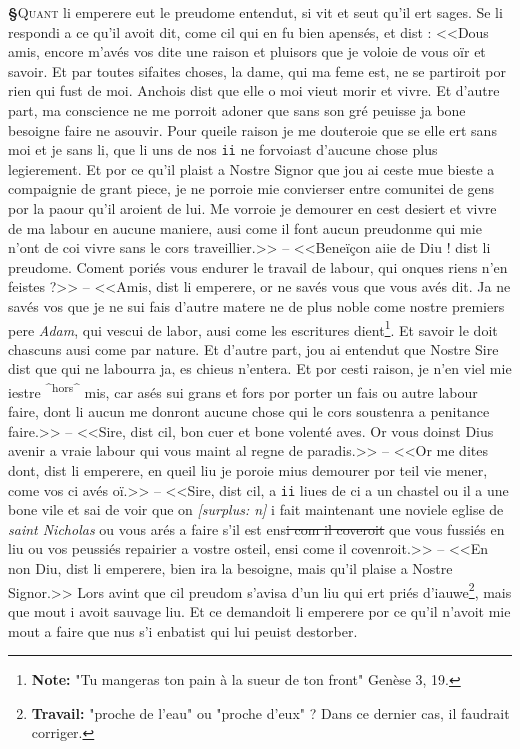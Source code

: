 \documentclass[12pt]{article} %
\newcommand{\persName}[1]{\emph{#1}} %
\newcommand{\num}[1]{\texttt{#1}}    %
\newcommand{\add}[1]{\textsuperscript{#1}}       %
\newcommand{\fnnote}[1]{\footnote{\textbf{Note:} #1}} %
\newcommand{\fnworknote}[1]{\footnote{\textbf{Travail:} #1}} %
\newcommand{\del}[1]{\sout{#1}}      %
\newcommand{\surplus}[1]{\textit{[surplus: #1]}} %
\newcounter{paranum}
\newcommand{\pnum}{\stepcounter{paranum}\textbf{§\arabic{paranum}}\quad}
\begin{document}
\pnum \lettrine[lines=2]{\color{darkblue}Q}{uant} li emperere eut le preudome entendut, si vit et seut qu'il ert sages. Se li respondi a ce qu'il avoit dit, come cil qui en fu bien apensés, et dist : <<Dous amis, encore m'avés vos dite une raison et pluisors que je voloie de vous oïr et savoir. Et par toutes sifaites choses, la dame, qui ma feme est, ne se partiroit por rien qui fust de moi. Anchois dist que elle o moi vieut morir et vivre. Et d'autre part, ma conscience ne me porroit adoner que sans son gré peuisse ja bone besoigne faire ne asouvir. Pour queile raison je me douteroie que se elle ert sans moi et je sans li, que li uns de nos \num{ii} ne forvoiast d'aucune chose plus legierement. Et por ce qu'il plaist a Nostre Signor que jou ai ceste mue bieste a compaignie de grant piece, je ne porroie mie convierser entre comunitei de gens por la paour qu'il aroient de lui. Me vorroie je demourer en cest desiert et vivre de ma labour en aucune maniere, ausi come il font aucun preudonme qui mie n'ont de coi vivre sans le cors traveillier.>> -- <<Beneïçon aiie de Diu ! dist li preudome. Coment poriés vous endurer le travail de labour, qui onques riens n'en feistes ?>> -- <<Amis, dist li emperere, or ne savés vous que vous avés dit. Ja ne savés vos que je ne sui fais d'autre matere ne de plus noble come nostre premiers pere \persName{Adam}, qui vescui de labor, ausi come les escritures dient\fnnote{"Tu mangeras ton pain à la sueur de ton front" Genèse 3, 19.}. Et savoir le doit chascuns ausi come par nature. Et d'autre part, jou ai entendut que Nostre Sire dist que qui ne labourra ja, es chieus n'entera. Et por cesti raison, je n'en viel mie iestre \add{^hors^} mis, car asés sui grans et fors por porter un fais ou autre labour faire, dont li aucun me donront aucune chose qui le cors soustenra a penitance faire.>> -- <<Sire, dist cil, bon cuer et bone volenté aves. Or vous doinst Dius avenir a vraie labour qui vous maint al regne de paradis.>> -- <<Or me dites dont, dist li emperere, en queil liu je poroie mius demourer por teil vie mener, come vos ci avés oï.>> -- <<Sire, dist cil, a \num{ii} liues de ci a un chastel ou il a une bone vile et sai de voir que on \surplus{n} i fait maintenant une noviele eglise de \persName{saint Nicholas} ou vous arés a faire s'il est ens\del{i com il coveroit} que vous fussiés en liu ou vos peussiés repairier a vostre osteil, ensi come il covenroit.>> -- <<En non Diu, dist li emperere, bien ira la besoigne, mais qu'il plaise a Nostre Signor.>> Lors avint que cil preudom s'avisa d'un liu qui ert priés d'iauwe\fnworknote{"proche de l'eau" ou "proche d'eux" ? Dans ce dernier cas, il faudrait corriger.}, mais que mout i avoit sauvage liu. Et ce demandoit li emperere por ce qu'il n'avoit mie mout a faire que nus s'i enbatist qui lui peuist destorber.
\end{document}
